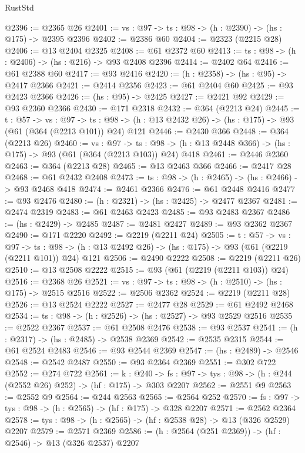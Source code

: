 \begin{lexlean}{RustStd}
\begin{coremodule}
@2396 := @2365 @26
@2401 := {vs : @97} -> {ts : @98} -> (h : @2390) -> (hs : @175) -> @2395 @2396
@2402 := @2386 @60
@2404 := @2323 (@2215 @28)
@2406 := @13 @2404 @2325
@2408 := @61 @2372 @60
@2413 := {ts : @98} -> (h : @2406) -> (hs : @216) -> @93 @2408 @2396
@2414 := @2402 @64
@2416 := @61 @2388 @60
@2417 := @93 @2416
@2420 := (h : @2358) -> (hs : @95) -> @2417 @2366
@2421 := @2414 @2356
@2423 := @61 @2404 @60
@2425 := @93 @2423 @2366
@2426 := (hs : @95) -> @2425
@2427 := @2421 @92
@2429 := @93 @2360 @2366
@2430 := @171 @2318
@2432 := @364 (@2213 @24)
@2445 := {t : @57} ->
  {vs : @97} ->
  {ts : @98} -> (h : @13 @2432 @26) -> (hs : @175) -> @93 (@61 (@364 (@2213 @101)) @24) @121
@2446 := @2430 @366
@2448 := @364 (@2213 @26)
@2460 := {vs : @97} ->
  {ts : @98} -> (h : @13 @2448 @366) -> (hs : @175) -> @93 (@61 (@364 (@2213 @103)) @24) @418
@2461 := @2446 @2360
@2463 := @364 (@2213 @28)
@2465 := @13 @2463 @366
@2466 := @2417 @28
@2468 := @61 @2432 @2408
@2473 := {ts : @98} -> (h : @2465) -> (hs : @2466) -> @93 @2468 @418
@2474 := @2461 @2366
@2476 := @61 @2448 @2416
@2477 := @93 @2476
@2480 := (h : @2321) -> (hs : @2425) -> @2477 @2367
@2481 := @2474 @2319
@2483 := @61 @2463 @2423
@2485 := @93 @2483 @2367
@2486 := (hs : @2429) -> @2485
@2487 := @2481 @2427
@2489 := @93 @2362 @2367
@2490 := @171 @2220
@2492 := @2219 (@2211 @24)
@2505 := {t : @57} ->
  {vs : @97} ->
  {ts : @98} -> (h : @13 @2492 @26) -> (hs : @175) -> @93 (@61 (@2219 (@2211 @101)) @24) @121
@2506 := @2490 @2222
@2508 := @2219 (@2211 @26)
@2510 := @13 @2508 @2222
@2515 := @93 (@61 (@2219 (@2211 @103)) @24)
@2516 := @2368 @26
@2521 := {vs : @97} -> {ts : @98} -> (h : @2510) -> (hs : @175) -> @2515 @2516
@2522 := @2506 @2362
@2524 := @2219 (@2211 @28)
@2526 := @13 @2524 @2222
@2527 := @2477 @28
@2529 := @61 @2492 @2468
@2534 := {ts : @98} -> (h : @2526) -> (hs : @2527) -> @93 @2529 @2516
@2535 := @2522 @2367
@2537 := @61 @2508 @2476
@2538 := @93 @2537
@2541 := (h : @2317) -> (hs : @2485) -> @2538 @2369
@2542 := @2535 @2315
@2544 := @61 @2524 @2483
@2546 := @93 @2544 @2369
@2547 := (hs : @2489) -> @2546
@2548 := @2542 @2487
@2550 := @93 @2364 @2369
@2551 := @302 @722
@2552 := @274 @722
@2561 := {k : @240} ->
  {fs : @97} -> {tys : @98} -> (h : @244 (@2552 @26) @252) -> (hf : @175) -> @303 @2207
@2562 := @2551 @9
@2563 := @2552 @9
@2564 := @244 @2563
@2565 := @2564 @252
@2570 := {fs : @97} -> {tys : @98} -> (h : @2565) -> (hf : @175) -> @328 @2207
@2571 := @2562 @2364
@2578 := {tys : @98} -> (h : @2565) -> (hf : @2538 @28) -> @13 (@326 @2529) @2207
@2579 := @2571 @2369
@2586 := (h : @2564 (@251 @2369)) -> (hf : @2546) -> @13 (@326 @2537) @2207

\end{coremodule}
\end{lexlean}

